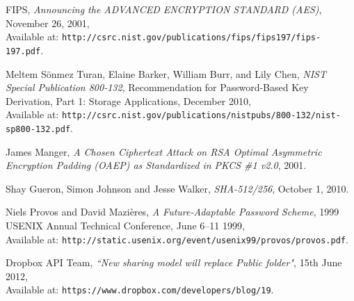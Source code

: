 \documentclass[12pt, titlepage]{article}
\begin{document}
\begin{thebibliography}{10}
FIPS, \emph{Announcing the ADVANCED ENCRYPTION STANDARD (AES)}, November 26, 2001,
\\ Available at:
\texttt{http://csrc.nist.gov/publications/fips/fips197/fips-197.pdf}.

Meltem Sönmez Turan, Elaine Barker, William Burr, and Lily Chen, \emph{NIST Special Publication 800-132}, Recommendation for Password-Based Key Derivation, Part 1: Storage Applications, December 2010,
\\ Available at: \texttt{http://csrc.nist.gov/publications/nistpubs/800-132/nist-sp800-132.pdf}.

James Manger, \emph{A Chosen Ciphertext Attack on RSA Optimal Asymmetric Encryption Padding (OAEP) as Standardized in PKCS \#1 v2.0}, 2001.

Shay Gueron, Simon Johnson and Jesse Walker, \emph{SHA-512/256}, October 1, 2010.

Niels Provos and David Mazières, \emph{A Future-Adaptable Password Scheme}, 1999 USENIX Annual Technical Conference, June 6–11 1999,
\\ Available at: \texttt{http://static.usenix.org/event/usenix99/provos/provos.pdf}. 

Dropbox API Team, \emph{``New sharing model will replace Public folder"},  15th June 2012,
\\ Available at: \texttt{https://www.dropbox.com/developers/blog/19}.

\end{thebibliography}
\end{document}
